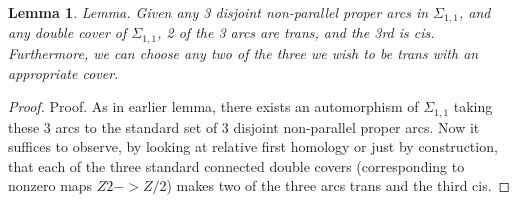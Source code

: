 \documentclass[12pt]{amsart}
\newtheorem{lemma}[theorem]{Lemma}
\theoremstyle{definition}
\newcommand{\Si}{\Sigma}
\begin{document}
\begin{lemma}

Lemma. Given any 3 disjoint non-parallel proper arcs in $\Si_{1,1}$, and any double
cover of $\Si_{1,1}$, 2 of the 3 arcs are trans, and the 3rd is cis.
Furthermore, we can choose any two of the three we wish to be trans with an
appropriate cover.

\end{lemma}
\begin{proof}

Proof. As in earlier lemma, there exists an automorphism of $\Si_{1,1}$
taking these 3 arcs to the standard set of 3 disjoint non-parallel proper arcs.
Now it suffices to observe, by looking at relative first homology or just by
construction, that each of the three standard connected double covers
(corresponding to nonzero maps $Z2 -> Z/2$) makes two of the three arcs trans and
the third cis.

\end{proof}
\end{document}
